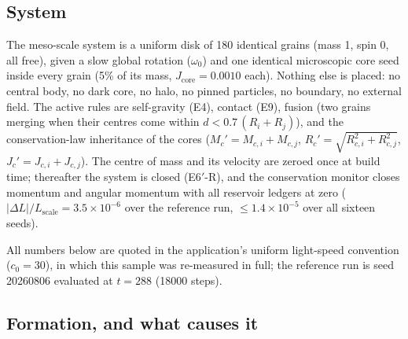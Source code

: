 \documentclass[aps,reprint,amsmath,amssymb,nofootinbib,superscriptaddress,floatfix]{revtex4-2}
\begin{document}

\subsection{System}

The meso-scale system is a uniform disk of 180 identical grains (mass
1, spin 0, all free), given a slow global rotation
($\omega_0$) and one identical microscopic core seed inside every grain
(5\% of its mass, $J_{\mathrm{core}}=0.0010$ each). Nothing else is
placed: no central body, no dark core, no halo, no pinned particles, no
boundary, no external field. The active rules are self-gravity (E4),
contact (E9), fusion (two grains merging when their centres come within
$d<0.7\,(R_i+R_j)$), and the conservation-law inheritance of the cores
($M_c' = M_{c,i}+M_{c,j}$, $R_c' = \sqrt{R_{c,i}^2+R_{c,j}^2}$,
$J_c' = J_{c,i}+J_{c,j}$). The centre of mass and its velocity are
zeroed once at build time; thereafter the system is closed (E6$'$-R),
and the conservation monitor closes momentum and angular momentum with
all reservoir ledgers at zero ($|\Delta L|/L_{\mathrm{scale}} =
3.5\times10^{-6}$ over the reference run, $\leq 1.4\times10^{-5}$ over
all sixteen seeds).

All numbers below are quoted in the application's uniform light-speed
convention ($c_0=30$), in which this sample was re-measured in full;
the reference run is seed 20260806 evaluated at $t=288$ (18000 steps).

\subsection{Formation, and what causes it}
\end{document}
